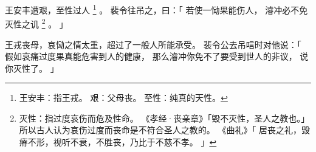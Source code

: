 
\switchcolumn*[\section{}]

王安丰遭艰，至性过人%
\footnote{%
    王安丰：指王戎。
    艰：父母丧。
    至性：纯真的天性。
}%
。
裴令往吊之，曰：「
    若使一恸果能伤人，
    濬冲必不免灭性之讥%
    \footnote{%
        灭性：指过度哀伤而危及性命。
              《孝经·丧亲章》「毁不灭性，圣人之教也。」
              所以古人认为哀伤过度而丧命是不符合圣人之教的。
              《曲礼》「
                  居丧之礼，毁瘠不形，视听不衰，不胜丧，乃比于不慈不孝。
              」
    }%
    。
」

\switchcolumn

王戎丧母，哀恸之情太重，超过了一般人所能承受。
裴令公去吊唁时对他说：「
    假如哀痛过度果真能危害到人的健康，
    那么濬冲你免不了要受到世人的非议，
    说你灭性了。
」


